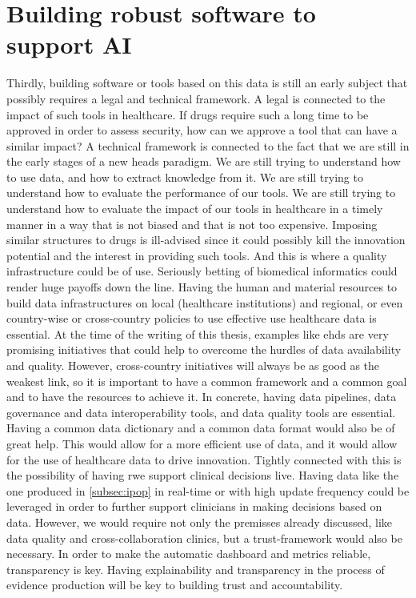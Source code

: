 \section{Building robust software to support AI}
Thirdly, building software or tools based on this data is still an early subject that possibly requires a legal and technical framework. A legal is connected to the impact of such tools in healthcare. If drugs require such a long time to be approved in order to assess security, how can we approve a tool that can have a similar impact? A technical framework is connected to the fact that we are still in the early stages of a new \ac{heads} paradigm. We are still trying to understand how to use data, and how to extract knowledge from it. We are still trying to understand how to evaluate the performance of our tools.  We are still trying to understand how to evaluate the impact of our tools in healthcare in a timely manner in a way that is not biased and that is not too expensive. Imposing similar structures to drugs is ill-advised since it could possibly kill the innovation potential and the interest in providing such tools. And this is where a quality infrastructure could be of use. Seriously betting of biomedical informatics could render huge payoffs down the line. Having the human and material resources to build data infrastructures on local (healthcare institutions) and regional, or even country-wise or cross-country policies to use effective use healthcare data is essential. At the time of the writing of this thesis, examples like \ac{ehds} are very promising initiatives that could help to overcome the hurdles of data availability and quality. However, cross-country initiatives will always be as good as the weakest link, so it is important to have a common framework and a common goal and to have the resources to achieve it. In concrete, having data pipelines, data governance and data interoperability tools, and data quality tools are essential. Having a common data dictionary and a common data format would also be of great help. This would allow for a more efficient use of data, and it would allow for the use of healthcare data to drive innovation.
Tightly connected with this is the possibility of having \ac{rwe} support clinical decisions live. Having data like the one produced in \ref{subsec:ipop} in real-time or with high update frequency could be leveraged in order to further support clinicians in making decisions based on data. However, we would require not only the premisses already discussed, like data quality and cross-collaboration clinics, but a trust-framework would also be necessary. In order to make the automatic dashboard and metrics reliable, transparency is key. Having explainability and transparency in the process of evidence production will be key to building trust and accountability.


